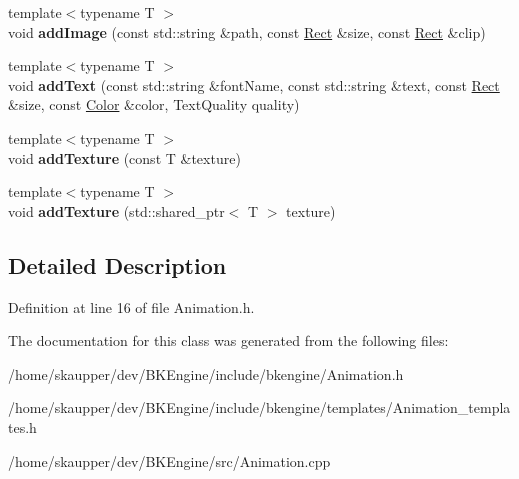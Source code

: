 \begin{DoxyCompactItemize}
\mbox{\label{classbkengine_1_1Animation_a99fce2e0d0de7f16c3015c59447956cb}} 
{\footnotesize template$<$typename T $>$ }\\void {\bfseries add\+Image} (const std\+::string \&path, const \hyperlink{structbkengine_1_1Rect}{Rect} \&size, const \hyperlink{structbkengine_1_1Rect}{Rect} \&clip)
\item 
\mbox{\label{classbkengine_1_1Animation_a96db630ab68419582cae430efb7cf0ed}} 
{\footnotesize template$<$typename T $>$ }\\void {\bfseries add\+Text} (const std\+::string \&font\+Name, const std\+::string \&text, const \hyperlink{structbkengine_1_1Rect}{Rect} \&size, const \hyperlink{structbkengine_1_1Color}{Color} \&color, Text\+Quality quality)
\item 
\mbox{\label{classbkengine_1_1Animation_a1f322fcb75e0128ae9a61580291c5637}} 
{\footnotesize template$<$typename T $>$ }\\void {\bfseries add\+Texture} (const T \&texture)
\item 
\mbox{\label{classbkengine_1_1Animation_a44c346878aafe731e46f303d518affe0}} 
{\footnotesize template$<$typename T $>$ }\\void {\bfseries add\+Texture} (std\+::shared\+\_\+ptr$<$ T $>$ texture)
\end{DoxyCompactItemize}


\subsection{Detailed Description}


Definition at line 16 of file Animation.\+h.



The documentation for this class was generated from the following files\+:\begin{DoxyCompactItemize}
\item 
/home/skaupper/dev/\+B\+K\+Engine/include/bkengine/Animation.\+h\item 
/home/skaupper/dev/\+B\+K\+Engine/include/bkengine/templates/Animation\+\_\+templates.\+h\item 
/home/skaupper/dev/\+B\+K\+Engine/src/Animation.\+cpp\end{DoxyCompactItemize}
